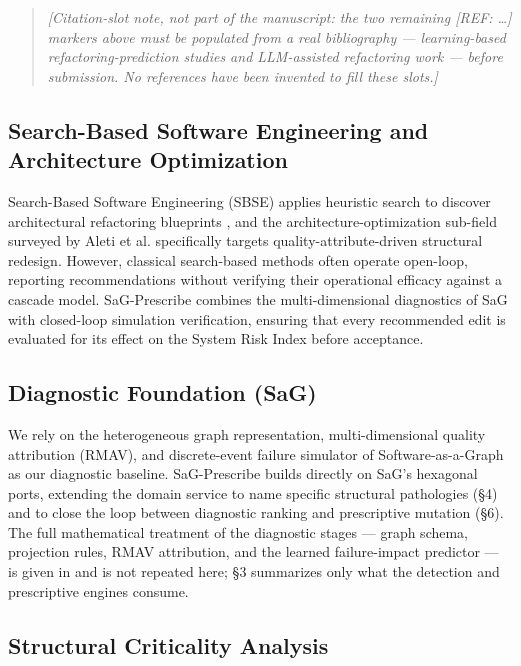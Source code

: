 \documentclass[11pt]{article}
\begin{document}
\begin{quote}
\emph{[Citation-slot note, not part of the manuscript: the two remaining [REF: \ldots] markers above
must be populated from a real bibliography --- learning-based refactoring-prediction studies and
LLM-assisted refactoring work --- before submission. No references have been invented to fill these
slots.]}
\end{quote}

\subsection{Search-Based Software Engineering and Architecture Optimization}

Search-Based Software Engineering (SBSE) applies heuristic search to discover architectural
refactoring blueprints \cite{Harman2012}, and the architecture-optimization sub-field surveyed by
Aleti et al. \cite{Aleti2013} specifically targets quality-attribute-driven structural redesign.
However, classical search-based methods often operate open-loop, reporting recommendations without
verifying their operational efficacy against a cascade model. SaG-Prescribe combines the
multi-dimensional diagnostics of SaG \cite{SaG} with closed-loop simulation verification, ensuring
that every recommended edit is evaluated for its effect on the System Risk Index before acceptance.

\subsection{Diagnostic Foundation (SaG)}

We rely on the heterogeneous graph representation, multi-dimensional quality attribution (RMAV), and
discrete-event failure simulator of Software-as-a-Graph \cite{SaG} as our diagnostic baseline.
SaG-Prescribe builds directly on SaG's hexagonal ports, extending the domain service to name specific
structural pathologies (\S4) and to close the loop between diagnostic ranking and prescriptive
mutation (\S6). The full mathematical treatment of the diagnostic stages --- graph schema, projection
rules, RMAV attribution, and the learned failure-impact predictor --- is given in \cite{SaG} and is
not repeated here; \S3 summarizes only what the detection and prescriptive engines consume.

\subsection{Structural Criticality Analysis}
\end{document}
